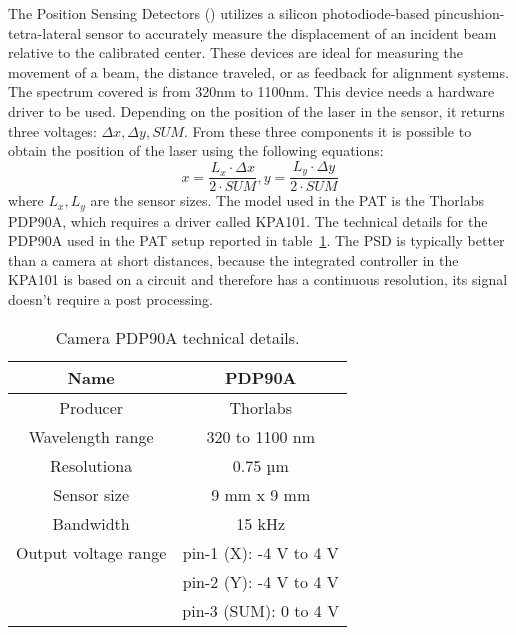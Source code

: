 The Position Sensing Detectors () utilizes a silicon photodiode-based pincushion-tetra-lateral sensor to accurately measure the displacement of an incident beam relative to the calibrated center. These devices are ideal for measuring the movement of a beam, the distance traveled, or as feedback for alignment systems.
The spectrum covered is from 320nm to 1100nm. This device needs a hardware driver to be used. Depending on the position of the laser in the sensor, it returns three voltages: $\Delta x, \Delta y, SUM$.
From these three components it is possible to obtain the position of the laser using the following equations:
\begin{equation}
  x = \frac{L_x \cdot \Delta x}{2 \cdot SUM}, y = \frac{L_y \cdot \Delta y}{2 \cdot  SUM}
\end{equation}
where $L_x,L_y$ are the sensor sizes. The model used in the PAT is the Thorlabs PDP90A, which requires a driver called KPA101. The technical details for the PDP90A used in the PAT setup reported in table~\ref{table:2}.
The PSD is typically better than a camera at short distances, because the integrated controller in the KPA101 is based on a circuit and therefore has a continuous resolution, its signal doesn't require a post processing.

\begin{table}[h!]
  \centering
  \begin{tabular}{ |c|c| }
    \hline
    Name                 & PDP90A                 \\\hline
    Producer             & Thorlabs               \\\hline
    Wavelength range     & 320 to 1100 nm         \\\hline
    Resolutiona          & 0.75 µm                \\\hline
    Sensor size          & 9 mm x 9 mm            \\\hline
    Bandwidth            & 15 kHz                 \\\hline
    Output voltage range & pin-1 (X): -4 V to 4 V \\
                         & pin-2 (Y): -4 V to 4 V \\
                         & pin-3 (SUM): 0 to 4 V  \\\hline
  \end{tabular}
  \caption{Camera PDP90A technical details.}
  \label{table:2}
\end{table}

